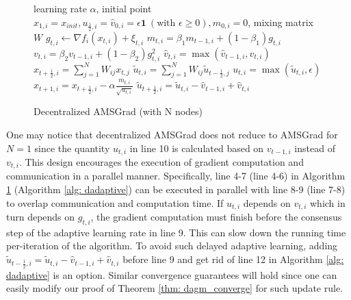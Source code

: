 \documentclass{article} %
\begin{document}
\begin{figure}\vspace{-0.15in}
\begin{minipage}{\linewidth}
\begin{algorithm}[H]
	\caption{Decentralized AMSGrad (with N nodes)}
	\label{alg: damsgrad}
	\begin{algorithmic}[1]
		 learning rate $\alpha$, initial point $x_{1,i} = x_{init}, u_{\frac{1}{2},i} = \hat v_{0,i} = \epsilon \mathbf 1\ (\text{with } \epsilon \geq 0), m_{0,i}=0$, mixing matrix $W$ 
		\STATE  $g_{t,i}  \leftarrow \nabla f_i(x_{t,i}) + \xi_{t,i}$
		\STATE $m_{t,i} = \beta_1 m_{t-1,i} + (1-\beta_1) g_{t,i}$ 
		\STATE $ v_{t,i} = \beta_2 v_{t-1,i} + (1-\beta_2) g_{t,i}^2 $
		\STATE $\hat v_{t,i} = \max (\hat v_{t-1,i}, v_{t,i} )$
		\STATE $x_{t+\frac{1}{2},i} = \sum_{j=1}^N W_{ij}x_{t,j}$
		\STATE $\tilde u_{t,i} = \sum_{j=1}^N W_{ij}\tilde u_{t-\frac{1}{2},j}$
	    \STATE $u_{t,i} = \max(\tilde u_{t,i}, \epsilon)$
		\STATE $x_{t+1,i} = x_{t+\frac{1}{2},i} - \alpha \frac{m_{t,i}}{\sqrt{u_{t,i}}}$
		\STATE $\tilde u_{t+\frac{1}{2},i} = \tilde u_{t,i} - \hat v_{t-1,i} + \hat v_{t,i}$
		\ENDFAP
		\ENDFOR
	\end{algorithmic}
\end{algorithm}\vspace{-0.1in}
\end{minipage}\end{figure}
One may notice that decentralized AMSGrad does not reduce to AMSGrad for $N=1$ since the quantity $u_{t,i}$ in line 10 is calculated based on $v_{t-1,i}$ instead of $v_{t,i}$.
This design encourages the execution of gradient computation and communication in a parallel manner. 
Specifically, line 4-7 (line 4-6) in Algorithm \ref{alg: damsgrad} (Algorithm \ref{alg: dadaptive}) can be executed in parallel with line 8-9 (line 7-8) to overlap communication and computation time. 
If $u_{t,i}$ depends on $v_{t,i}$ which in turn depends on $g_{t,i}$, the gradient computation must finish before the consensus step of the adaptive learning rate in line 9. 
This can slow down the running time per-iteration of the algorithm. 
To avoid such delayed adaptive learning, adding $\tilde u_{t-\frac{1}{2},i} = \tilde u_{t,i} - \hat v_{t-1,i} + \hat v_{t,i}$ before line 9 and get rid of line 12 in Algorithm \ref{alg: dadaptive} is an option.
Similar convergence guarantees will hold since one can easily modify our proof of Theorem \ref{thm: dagm_converge} for such update rule. 
\end{document}
